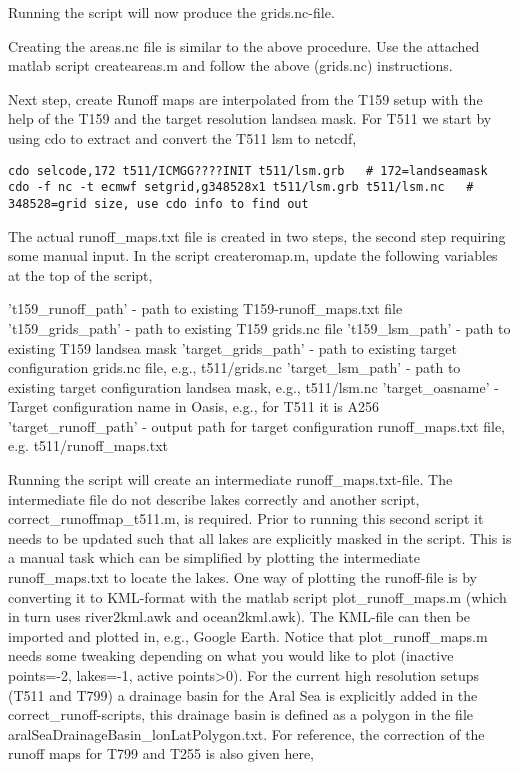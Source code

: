 Running the script will now produce the grids.nc-file.

Creating the areas.nc file is similar to the above procedure. Use the attached matlab script createareas.m and follow the above (grids.nc) instructions.

Next step, create  Runoff maps are interpolated from the T159 setup with the help of the T159 and the target resolution landsea mask. For T511 we start by using cdo to extract and convert the T511 lsm to netcdf,

\begin{verbatim}
cdo selcode,172 t511/ICMGG????INIT t511/lsm.grb   # 172=landseamask
cdo -f nc -t ecmwf setgrid,g348528x1 t511/lsm.grb t511/lsm.nc   # 348528=grid size, use cdo info to find out  
\end{verbatim}


\iffalse

The actual runoff\_maps.txt file is created in two steps, the second step requiring some manual input. In the script createromap.m, update the following variables at the top of the script,

    't159_runoff_path' - path to existing T159-runoff_maps.txt file
    't159_grids_path' - path to existing T159 grids.nc file
    't159_lsm_path' - path to existing T159 landsea mask
    'target_grids_path' - path to existing target configuration grids.nc file, e.g., t511/grids.nc
    'target_lsm_path' - path to existing target configuration landsea mask, e.g., t511/lsm.nc
    'target_oasname' - Target configuration name in Oasis, e.g., for T511 it is A256
    'target_runoff_path' - output path for target configuration runoff_maps.txt file, e.g. t511/runoff_maps.txt

Running the script will create an intermediate runoff_maps.txt-file. The intermediate file do not describe lakes correctly and another script, correct_runoffmap_t511.m, is required. Prior to running this second script it needs to be updated such that all lakes are explicitly masked in the script. This is a manual task which can be simplified by plotting the intermediate runoff_maps.txt to locate the lakes. One way of plotting the runoff-file is by converting it to KML-format with the matlab script plot_runoff_maps.m (which in turn uses river2kml.awk and ocean2kml.awk). The KML-file can then be imported and plotted in, e.g., Google Earth. Notice that plot_runoff_maps.m needs some tweaking depending on what you would like to plot (inactive points=-2, lakes=-1, active points>0). For the current high resolution setups (T511 and T799) a drainage basin for the Aral Sea is explicitly added in the correct_runoff-scripts, this drainage basin is defined as a polygon in the file aralSeaDrainageBasin_lonLatPolygon.txt.
For reference, the correction of the runoff maps for T799 and T255 is also given here,

